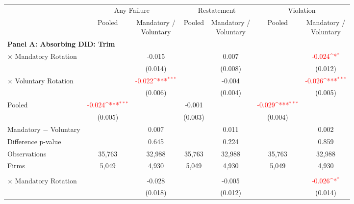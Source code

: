 \documentclass[10pt]{article}
\newcommand{\sym}[1]{\textsuperscript{#1}}
\begin{document}
\begin{minipage}{19cm}\fontsize{10}{12}\selectfont\setlength{\tabcolsep}{4pt}\renewcommand{\arraystretch}{1.12}


\def\sym#1{\ifmmode^{#1}\else\(^{#1}\)\fi}
\centering
{}
\label{tab:absorbing-transition-clean-historical-violation-downgrade-no-auditfirm-fe}
\begin{threeparttable}

\begin{tabular}{l cc cc cc}
\toprule
 & \multicolumn{2}{c}{Any Failure} & \multicolumn{2}{c}{Restatement} & \multicolumn{2}{c}{Violation} \\
\cmidrule(lr){2-3}\cmidrule(lr){4-5}\cmidrule(lr){6-7}
 & Pooled & \shortstack{Mandatory /\\Voluntary} & Pooled & \shortstack{Mandatory /\\Voluntary} & Pooled & \shortstack{Mandatory /\\Voluntary} \\
\midrule
\multicolumn{7}{l}{\textbf{Panel A: Absorbing DID: Trim}} \\
$\times$ Mandatory Rotation &  & -0.015 &  & 0.007 &  & \textcolor{red}{-0.024\sym{*}} \\
 &  & (0.014) &  & (0.008) &  & (0.012) \\
$\times$ Voluntary Rotation &  & \textcolor{red}{-0.022\sym{***}} &  & -0.004 &  & \textcolor{red}{-0.026\sym{***}} \\
 &  & (0.006) &  & (0.004) &  & (0.005) \\
Pooled & \textcolor{red}{-0.024\sym{***}} &  & -0.001 &  & \textcolor{red}{-0.029\sym{***}} &  \\
 & (0.005) &  & (0.003) &  & (0.004) &  \\
Mandatory $-$ Voluntary &  & 0.007 &  & 0.011 &  & 0.002 \\
Difference p-value &  & 0.645 &  & 0.224 &  & 0.859 \\
Observations & 35,763 & 32,988 & 35,763 & 32,988 & 35,763 & 32,988 \\
Firms & 5,049 & 4,930 & 5,049 & 4,930 & 5,049 & 4,930 \\
\addlinespace
\multicolumn{7}{l}{\textbf{Panel B: Absorbing DID: Strict}} \\
$\times$ Mandatory Rotation &  & -0.028 &  & -0.005 &  & \textcolor{red}{-0.026\sym{*}} \\
 &  & (0.018) &  & (0.012) &  & (0.014) \\

\end{tabular}
\end{threeparttable}
\end{minipage}
\end{document}
